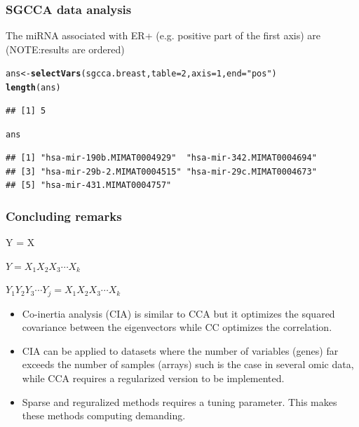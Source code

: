 \documentclass[10pt,xcolor=dvipsnames]{beamer}\usepackage[]{graphicx}\usepackage[]{color}
\makeatletter
\newcommand{\hlnum}[1]{\textcolor[rgb]{0.686,0.059,0.569}{#1}}%
\newcommand{\hlstr}[1]{\textcolor[rgb]{0.192,0.494,0.8}{#1}}%
\newcommand{\hlstd}[1]{\textcolor[rgb]{0.345,0.345,0.345}{#1}}%
\newcommand{\hlkwb}[1]{\textcolor[rgb]{0.69,0.353,0.396}{#1}}%
\newcommand{\hlkwc}[1]{\textcolor[rgb]{0.333,0.667,0.333}{#1}}%
\newcommand{\hlkwd}[1]{\textcolor[rgb]{0.737,0.353,0.396}{\textbf{#1}}}%
\newenvironment{kframe}{%
 \def\at@end@of@kframe{}%
 \ifinner\ifhmode%
  \def\at@end@of@kframe{\end{minipage}}%
  \begin{minipage}{\columnwidth}%
 \fi\fi%
 \def\FrameCommand##1{\hskip\@totalleftmargin \hskip-\fboxsep
 \colorbox{shadecolor}{##1}\hskip-\fboxsep
     \hskip-\linewidth \hskip-\@totalleftmargin \hskip\columnwidth}%
 \MakeFramed {\advance\hsize-\width
   \@totalleftmargin\z@ \linewidth\hsize
   \@setminipage}}%
 {\par\unskip\endMakeFramed%
 \at@end@of@kframe}
\newenvironment{knitrout}{}{} %
\makeatother
\begin{document}
\begin{frame}\frametitle{SGCCA data analysis}

The miRNA associated with ER+ (e.g. positive part of the first axis) are (NOTE:results are ordered)
\begin{knitrout}\footnotesize
{}\color{fgcolor}\begin{kframe}
\begin{alltt}
\hlstd{ans} \hlkwb{<-} \hlkwd{selectVars}\hlstd{(sgcca.breast,} \hlkwc{table}\hlstd{=}\hlnum{2}\hlstd{,} \hlkwc{axis}\hlstd{=}\hlnum{1}\hlstd{,} \hlkwc{end}\hlstd{=}\hlstr{"pos"}\hlstd{)}
\hlkwd{length}\hlstd{(ans)}
\end{alltt}
\begin{verbatim}
## [1] 5
\end{verbatim}
\begin{alltt}
\hlstd{ans}
\end{alltt}
\begin{verbatim}
## [1] "hsa-mir-190b.MIMAT0004929"  "hsa-mir-342.MIMAT0004694"  
## [3] "hsa-mir-29b-2.MIMAT0004515" "hsa-mir-29c.MIMAT0004673"  
## [5] "hsa-mir-431.MIMAT0004757"
\end{verbatim}
\end{kframe}
\end{knitrout}

\end{frame}


\begin{frame}[plain]\frametitle{Concluding remarks}

\begin{description}[labelwidth=\widthof{\textbf{Canonical correlation}}]
 \item[Correlation] Y = X
 \item[Multiple correlation] $Y = X_1 X_2 X_3 \cdots X_k$
 \item[Canonical correlation] $Y_1 Y_2 Y_3 \cdots Y_j = X_1 X_2 X_3 \cdots X_k$
\end{description}

\begin{itemize}
  \item Co-inertia analysis (CIA) is similar to CCA but it optimizes the squared covariance between the eigenvectors while CC optimizes
        the correlation.
  \item CIA can be applied to datasets where the number of variables (genes) far exceeds the number of samples (arrays) such is the case in several omic data, while CCA requires a regularized version to be implemented.
  \item Sparse and reguralized methods requires a tuning parameter. This makes these methods computing demanding.
\end{itemize}


\end{frame}
\end{document}
